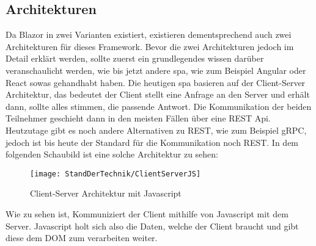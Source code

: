 \subsection{Architekturen}
\label{subsec:architekturen}
Da Blazor in zwei Varianten existiert, existieren dementsprechend auch zwei Architekturen für
dieses Framework. Bevor die zwei Architekturen jedoch im Detail erklärt werden, sollte zuerst ein
grundlegendes wissen darüber veranschaulicht werden, wie bis jetzt andere \ac{spa}, wie zum
Beispiel Angular oder React sowas gehandhabt haben. Die heutigen \ac{spa} basieren auf der
Client-Server Architektur, das bedeutet der Client stellt eine Anfrage an den Server und erhält
dann, sollte alles stimmen, die passende Antwort. Die Kommunikation der beiden Teilnehmer
geschieht dann in den meisten Fällen über eine REST Api. Heutzutage gibt es noch andere
Alternativen zu REST, wie zum Beispiel gRPC, jedoch ist bis heute der Standard für die
Kommunikation noch REST.
\newpage
In dem folgenden Schaubild ist eine solche Architektur zu sehen:
\begin{figure}[h]
    \centering
    \texttt{[image: StandDerTechnik/ClientServerJS]}
    \caption[Client-Server Architektur mit Javascript]{Client-Server Architektur mit Javascript}
    \label{img:clientserverjs}
\end{figure}

Wie zu sehen ist, Kommuniziert der Client mithilfe von Javascript mit dem Server. Javascript holt
sich also die Daten, welche der Client braucht und gibt diese dem DOM zum verarbeiten weiter.

